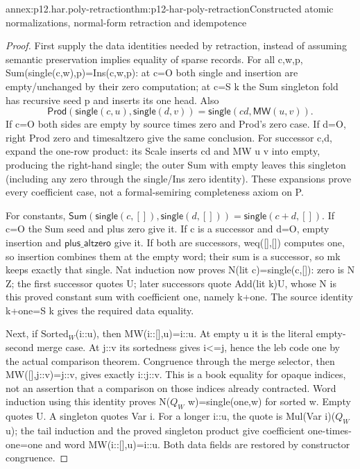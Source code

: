 \begin{annexitem}{annex:p12.har.poly-retraction}{thm:p12-har-poly-retraction}{Constructed atomic normalizations, normal-form retraction and idempotence}
\begin{proof}
First supply the data identities needed by retraction, instead of
assuming semantic preservation implies equality of sparse records.
For all c,w,p, Sum(single(c,w),p)=Ins(c,w,p): at c=O both single
and insertion are empty/unchanged by their zero computation; at c=S k
the Sum singleton fold has recursive seed p and inserts its one head.
Also
\[
 \mathsf{Prod}(\mathsf{single}(c,u),\mathsf{single}(d,v))
       =\mathsf{single}(cd,\mathsf{MW}(u,v)).
\]
If c=O both sides are empty by source times zero and Prod's zero
case. If d=O, right Prod zero and timesaltzero give the same conclusion.
For successor c,d, expand the one-row product: its Scale inserts cd
and MW u v into empty, producing the right-hand single; the outer
Sum with empty leaves this singleton (including any zero through the
single/Ins zero identity). These expansions prove every coefficient
case, not a formal-semiring completeness axiom on P.

For constants,
\(\mathsf{Sum}(\mathsf{single}(c,[]),\mathsf{single}(d,[]))
=\mathsf{single}(c+d,[])\).
If c=O the Sum seed and plus zero give it. If c is a successor and
d=O, empty insertion and \(\mathsf{plus\_altzero}\) give it. If both are successors,
weq([],[]) computes one, so insertion combines them at the empty
word; their sum is a successor, so mk keeps exactly that single.
Nat induction now proves N(lit c)=single(c,[]): zero is N Z;
the first successor quotes U; later successors quote Add(lit k)U,
whose N is this proved constant sum with coefficient one, namely k+one.
The source identity k+one=S k gives the required data equality.

Next, if \(\mathrm{Sorted}_W\)(i::u), then MW(i::[],u)=i::u. At empty u it
is the literal empty-second merge case. At j::v its sortedness gives
i<=j, hence the leb code one by the actual comparison theorem.
Congruence through the merge selector, then MW([],j::v)=j::v,
gives exactly i::j::v. This is a book equality for opaque indices,
not an assertion that a comparison on those indices already contracted.
Word induction using this identity proves
N(\(Q_W\) w)=single(one,w) for sorted w. Empty quotes U. A singleton
quotes Var i. For a longer i::u, the quote is Mul(Var i)(\(Q_W\) u);
the tail induction and the proved singleton product give coefficient
one-times-one=one and word MW(i::[],u)=i::u. Both data fields
are restored by constructor congruence.


\end{proof}
\end{annexitem}
